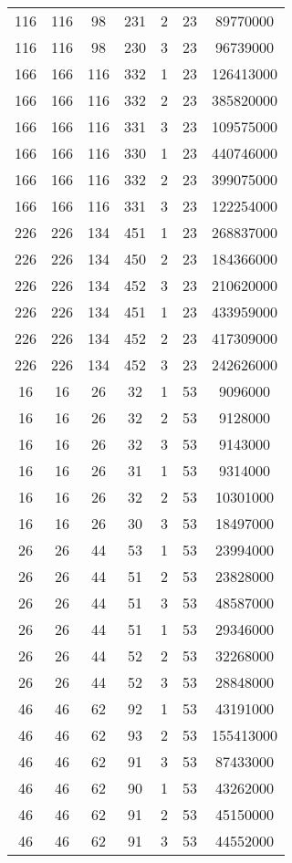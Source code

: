 \documentclass[a4paper,11pt]{article}
\begin{document}
\begin{longtable}{ |c|c|c|c|c|c|c| }
116 & 116 & 98 & 231 & 2 & 23 & 89770000 \\
116 & 116 & 98 & 230 & 3 & 23 & 96739000 \\
166 & 166 & 116 & 332 & 1 & 23 & 126413000 \\
166 & 166 & 116 & 332 & 2 & 23 & 385820000 \\
166 & 166 & 116 & 331 & 3 & 23 & 109575000 \\
166 & 166 & 116 & 330 & 1 & 23 & 440746000 \\
166 & 166 & 116 & 332 & 2 & 23 & 399075000 \\
166 & 166 & 116 & 331 & 3 & 23 & 122254000 \\
226 & 226 & 134 & 451 & 1 & 23 & 268837000 \\
226 & 226 & 134 & 450 & 2 & 23 & 184366000 \\
226 & 226 & 134 & 452 & 3 & 23 & 210620000 \\
226 & 226 & 134 & 451 & 1 & 23 & 433959000 \\
226 & 226 & 134 & 452 & 2 & 23 & 417309000 \\
226 & 226 & 134 & 452 & 3 & 23 & 242626000 \\
16 & 16 & 26 & 32 & 1 & 53 & 9096000 \\
16 & 16 & 26 & 32 & 2 & 53 & 9128000 \\
16 & 16 & 26 & 32 & 3 & 53 & 9143000 \\
16 & 16 & 26 & 31 & 1 & 53 & 9314000 \\
16 & 16 & 26 & 32 & 2 & 53 & 10301000 \\
16 & 16 & 26 & 30 & 3 & 53 & 18497000 \\
26 & 26 & 44 & 53 & 1 & 53 & 23994000 \\
26 & 26 & 44 & 51 & 2 & 53 & 23828000 \\
26 & 26 & 44 & 51 & 3 & 53 & 48587000 \\
26 & 26 & 44 & 51 & 1 & 53 & 29346000 \\
26 & 26 & 44 & 52 & 2 & 53 & 32268000 \\
26 & 26 & 44 & 52 & 3 & 53 & 28848000 \\
46 & 46 & 62 & 92 & 1 & 53 & 43191000 \\
46 & 46 & 62 & 93 & 2 & 53 & 155413000 \\
46 & 46 & 62 & 91 & 3 & 53 & 87433000 \\
46 & 46 & 62 & 90 & 1 & 53 & 43262000 \\
46 & 46 & 62 & 91 & 2 & 53 & 45150000 \\
46 & 46 & 62 & 91 & 3 & 53 & 44552000 \\

\end{longtable}
\end{document}

